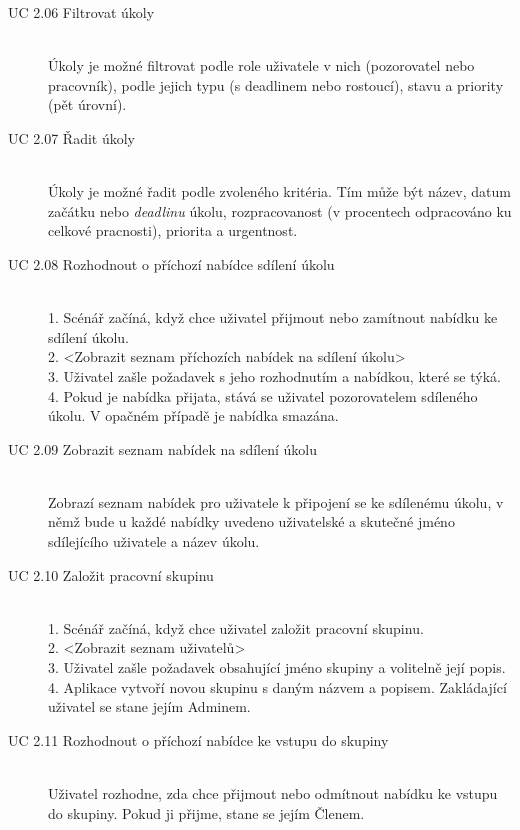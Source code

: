 \documentclass[thesis=B,czech]{FITthesis}[2012/06/26]
\begin{document}
\begin{description}
				\item[UC 2.06 Filtrovat úkoly] \hfill \\
					Úkoly je možné filtrovat podle role uživatele v nich (pozorovatel nebo pracovník), podle jejich typu (s deadlinem nebo rostoucí), stavu a priority (pět úrovní).
					
				\item[UC 2.07 Řadit úkoly] \hfill \\
					Úkoly je možné řadit podle zvoleného kritéria. Tím může být název, datum začátku nebo \textit{deadlinu} úkolu, rozpracovanost (v procentech odpracováno ku celkové pracnosti), priorita a urgentnost.
				
				\item[UC 2.08 Rozhodnout o příchozí nabídce sdílení úkolu] \hfill \\
					1. Scénář začíná, když chce uživatel přijmout nebo zamítnout nabídku ke sdílení úkolu. \\
					2. <Zobrazit seznam příchozích nabídek na sdílení úkolu> \\
					3. Uživatel zašle požadavek s jeho rozhodnutím a nabídkou, které se týká. \\
					4. Pokud je nabídka přijata, stává se uživatel pozorovatelem sdíleného úkolu. V opačném případě je nabídka smazána. \\
				
				\item[UC 2.09 Zobrazit seznam nabídek na sdílení úkolu] \hfill \\
					Zobrazí seznam nabídek pro uživatele k připojení se ke sdílenému úkolu, v němž bude u každé nabídky uvedeno uživatelské a skutečné jméno sdílejícího uživatele a název úkolu.
				
				\item[UC 2.10 Založit pracovní skupinu] \hfill \\
					1. Scénář začíná, když chce uživatel založit pracovní skupinu. \\
					2. <Zobrazit seznam uživatelů> \\
					3. Uživatel zašle požadavek obsahující jméno skupiny a volitelně její popis. \\
					4. Aplikace vytvoří novou skupinu s daným názvem a popisem. Zakládající uživatel se stane jejím Adminem. \\
					
				\item[UC 2.11 Rozhodnout o příchozí nabídce ke vstupu do skupiny] \hfill \\
					Uživatel rozhodne, zda chce přijmout nebo odmítnout nabídku ke vstupu do skupiny. Pokud ji přijme, stane se jejím Členem.
					

\end{description}
\end{document}
